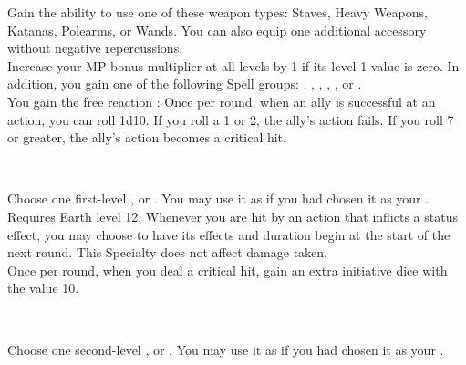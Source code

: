 \begin{tabjob}
    \tabjobspec{}

         Gain the ability to use one of these weapon types: Staves, Heavy Weapons, Katanas, Polearms, or Wands. You can also equip one additional accessory without negative repercussions. \\

         Increase your MP bonus multiplier at all levels by 1 if its level 1 value is zero. In addition, you gain one of the following Spell groups: , , , , , or . \\
        
         You gain the free reaction : Once per round, when an ally is successful at an action, you can roll 1d10. If you roll a 1 or 2, the ally's action fails. If you roll 7 or greater, the ally's action becomes a critical hit. \\

    \tabjobsep%

     \\
    \tabjobspec{}

         Choose one first-level ,  or . You may use it as if you had chosen it as your . \\

         Requires Earth level 12. Whenever you are hit by an action that inflicts a status effect, you may choose to have its effects and duration begin at the start of the next round. This Specialty does not affect damage taken. \\

         Once per round, when you deal a critical hit, gain an extra initiative dice with the value 10. \\

    \tabjobsep%

     \\
    \tabjobspec{}
    
         Choose one second-level ,  or . You may use it as if you had chosen it as your . \\


\end{tabjob}
